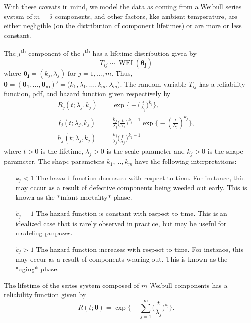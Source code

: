 \documentclass[
]{article}
\begin{document}
With these caveats in mind, we model the data as coming from a Weibull
series system of \(m = 5\) components, and other factors, like ambient
temperature, are either negligible (on the distribution of component
lifetimes) or are more or less constant.

The \(j\)\textsuperscript{th} component of the \(i\)\textsuperscript{th}
has a lifetime distribution given by \[
    T_{i j} \sim \operatorname{WEI}(\boldsymbol{\theta_j})
\] where \(\boldsymbol{\theta_j} = (k_j, \lambda_j)\) for
\(j=1,\ldots,m\). Thus,
\(\boldsymbol{\theta }= (\boldsymbol{\theta_1},\ldots,\boldsymbol{\theta_m})' = \bigl(k_1,\lambda_1,\ldots,k_m,\lambda_m\bigr)\).
The random variable \(T_{i j}\) has a reliability function, pdf, and
hazard function given respectively by \begin{align}
    R_j(t;\lambda_j,k_j)
        &= \exp\biggl\{-\biggl(\frac{t}{\lambda_j}\biggr)^{k_j}\biggr\},\\
    f_j(t;\lambda_j,k_j)
        &= \frac{k_j}{\lambda_j}\biggl(\frac{t}{\lambda_j}\biggr)^{k_j-1}
        \exp\biggl\{-\left(\frac{t}{\lambda_j}\right)^{k_j} \biggr\},\\
    h_j(t;\lambda_j,k_j) \label{eq:weibull_haz}
        &= \frac{k_j}{\lambda_j}\biggl(\frac{t}{\lambda_j}\biggr)^{k_j-1}
\end{align} where \(t > 0\) is the lifetime, \(\lambda_j > 0\) is the
scale parameter and \(k_j > 0\) is the shape parameter. The shape
parameters \(k_1, \ldots, k_m\) have the following interpretations:

\begin{enumerate}
\item[$k_j < 1$] The hazard function decreases with respect to time. For instance,
  this may occur as a result of defective components being weeded out early. This
  is known as the *infant mortality* phase.
\item[$k_j = 1$] The hazard function is constant with respect to time. This is an
  idealized case that is rarely observed in practice, but may be useful for modeling
  purposes.
\item[$k_j > 1$] The hazard function increases with respect to time. For instance,
  this may occur as a result of components wearing out. This is known as the
  *aging* phase.
\end{enumerate}

The lifetime of the series system composed of \(m\) Weibull components
has a reliability function given by \begin{equation}
\label{eq:sys_weibull_reliability_function}
R(t;\boldsymbol{\theta}) = \exp\biggl\{-\sum_{j=1}^{m}\biggl(\frac{t}{\lambda_j}\biggr)^{k_j}\biggr\}.
\end{equation}
\end{document}
